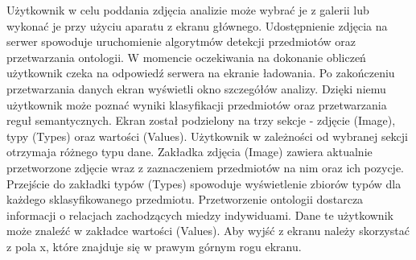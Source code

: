 {Użytkownik w celu poddania zdjęcia analizie może wybrać je z galerii lub wykonać je przy użyciu aparatu z ekranu głównego. Udostępnienie zdjęcia na serwer spowoduje uruchomienie algorytmów detekcji przedmiotów oraz przetwarzania ontologii. W momencie oczekiwania na dokonanie obliczeń użytkownik czeka na odpowiedź serwera na ekranie ładowania. Po zakończeniu przetwarzania danych ekran wyświetli okno szczegółów analizy. Dzięki niemu użytkownik może poznać wyniki klasyfikacji przedmiotów oraz przetwarzania reguł semantycznych. Ekran został podzielony na trzy sekcje - zdjęcie (Image), typy (Types) oraz wartości (Values). Użytkownik w zależności od wybranej sekcji otrzymaja różnego typu dane. Zakładka zdjęcia (Image) zawiera aktualnie przetworzone zdjęcie wraz z zaznaczeniem przedmiotów na nim oraz ich pozycje. Przejście do zakładki typów (Types) spowoduje wyświetlenie zbiorów typów dla każdego sklasyfikowanego przedmiotu. Przetworzenie ontologii dostarcza informacji o relacjach zachodzących miedzy indywiduami. Dane te użytkownik może znaleźć w zakładce wartości (Values). Aby wyjść z ekranu należy skorzystać z pola x, które znajduje się w prawym górnym rogu ekranu.

}
